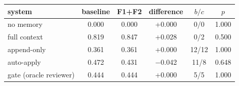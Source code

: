 \begin{tabular}{lccccc}
\toprule
system & baseline & F1+F2 & difference & $b/c$ & $p$ \\
\midrule
no memory & 0.000 & 0.000 & +0.000 & 0/0 & 1.000 \\
full context & 0.819 & 0.847 & +0.028 & 0/2 & 0.500 \\
append-only & 0.361 & 0.361 & +0.000 & 12/12 & 1.000 \\
auto-apply & 0.472 & 0.431 & $-$0.042 & 11/8 & 0.648 \\
gate (oracle reviewer) & 0.444 & 0.444 & +0.000 & 5/5 & 1.000 \\
\bottomrule
\end{tabular}
